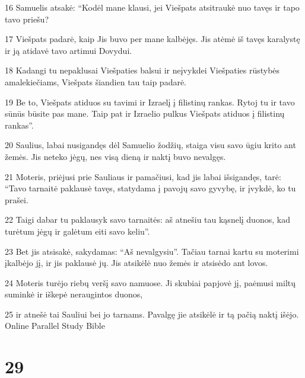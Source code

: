 \par 16 Samuelis atsakė: “Kodėl mane klausi, jei Viešpats atsitraukė nuo tavęs ir tapo tavo priešu? 
\par 17 Viešpats padarė, kaip Jis buvo per mane kalbėjęs. Jis atėmė iš tavęs karalystę ir ją atidavė tavo artimui Dovydui. 
\par 18 Kadangi tu nepaklusai Viešpaties balsui ir neįvykdei Viešpaties rūstybės amalekiečiams, Viešpats šiandien tau taip padarė. 
\par 19 Be to, Viešpats atiduos su tavimi ir Izraelį į filistinų rankas. Rytoj tu ir tavo sūnūs būsite pas mane. Taip pat ir Izraelio pulkus Viešpats atiduos į filistinų rankas”. 
\par 20 Saulius, labai nusigandęs dėl Samuelio žodžių, staiga visu savo ūgiu krito ant žemės. Jis neteko jėgų, nes visą dieną ir naktį buvo nevalgęs. 
\par 21 Moteris, priėjusi prie Sauliaus ir pamačiusi, kad jis labai išsigandęs, tarė: “Tavo tarnaitė paklausė tavęs, statydama į pavojų savo gyvybę, ir įvykdė, ko tu prašei. 
\par 22 Taigi dabar tu paklausyk savo tarnaitės: aš atnešiu tau kąsnelį duonos, kad turėtum jėgų ir galėtum eiti savo keliu”. 
\par 23 Bet jis atsisakė, sakydamas: “Aš nevalgysiu”. Tačiau tarnai kartu su moterimi įkalbėjo jį, ir jis paklausė jų. Jis atsikėlė nuo žemės ir atsisėdo ant lovos. 
\par 24 Moteris turėjo riebų veršį savo namuose. Ji skubiai papjovė jį, paėmusi miltų suminkė ir iškepė neraugintos duonos, 
\par 25 ir atnešė tai Sauliui bei jo tarnams. Pavalgę jie atsikėlė ir tą pačią naktį išėjo.
Online Parallel Study Bible



\chapter{29}


